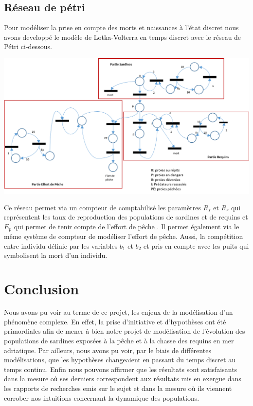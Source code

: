 \documentclass[a4paper, 11pt]{report}%
\begin{document}
        \subsection{Réseau de pétri}
        Pour modéliser la prise en compte des morts et naissances à l'état discret nous avons developpé
        le modèle de Lotka-Volterra en temps discret avec le réseau de Pétri ci-dessous. 

        \begin{center}
            \includegraphics[width=14cm]{figures/reseau_petri.png}
        \end{center}

        Ce réseau permet via un compteur de comptabilisé les paramètres $R_s$ et $R_r$  qui représentent les taux de
        reproduction des populations de sardines et de requins et $E_p$ qui permet de tenir compte de l'effort de pêche . Il permet également via le même système de compteur de modéliser 
        l'effort de pêche. Aussi, la compétition entre individu définie par les variables $b_1$ et $b_2$ et pris en
        compte avec les puits qui symbolisent la mort d'un individu.
    \section{Conclusion}
    Nous avons pu voir au terme de ce projet, les enjeux de la modélisation d'un phénomène complexe. En effet, 
    la prise d'initiative et d'hypothèses ont été primordiales afin de mener à bien notre projet de modélisation 
    de l'évolution des populations de sardines exposées à la pêche et à la chasse des requins en mer adriatique. 
    Par ailleurs, nous avons pu voir, par le biais de différentes modélisations, que les hypothèses changeaient
    en passant du temps discret au temps continu. Enfin nous pouvons affirmer que les résultats sont satisfaisants
    dans la mesure où ses derniers correspondent aux résultats mis en exergue dans les rapports de recherches emis 
    sur le sujet et dans la mesure où ils viennent corrober nos intuitions concernant la dynamique des populations.
    \nocite{*}
    
\end{document}
